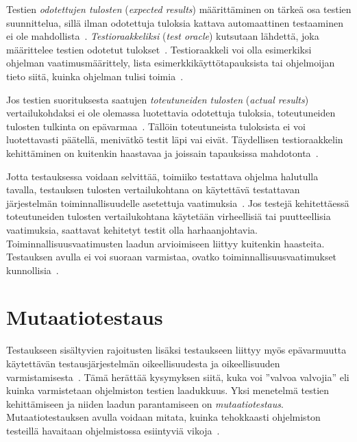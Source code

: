 \documentclass[finnish, grading]{tktltiki2}
\theoremstyle{definition}
\theoremstyle{remark}
\begin{document}
Testien \textit{odotettujen tulosten} (\textit{expected results}) määrittäminen on tärkeä osa testien suunnittelua, sillä ilman odotettuja tuloksia kattava automaattinen testaaminen ei ole mahdollista~\cite[s. 917]{Binder:1999}. \textit{Testioraakkeliksi} (\textit{test oracle}) kutsutaan lähdettä, joka määrittelee testien odotetut tulokset~\cite[s. 917]{Binder:1999}. Testioraakkeli voi olla esimerkiksi ohjelman vaatimusmäärittely, lista esimerkkikäyttötapauksista tai ohjelmoijan tieto siitä, kuinka ohjelman tulisi toimia~\cite[s. 918]{Binder:1999}. 

Jos testien suorituksesta saatujen \textit{toteutuneiden tulosten} (\textit{actual results}) vertailukohdaksi ei ole olemassa luotettavia odotettuja tuloksia, toteutuneiden tulosten tulkinta on epävarmaa~\cite[s. 58]{Binder:1999}. Tällöin toteutuneista tuloksista ei voi luotettavasti päätellä, menivätkö testit läpi vai eivät. Täydellisen testioraakkelin kehittäminen on kuitenkin haastavaa ja joissain tapauksissa mahdotonta~\cite[s. 58]{Binder:1999}.

Jotta testauksessa voidaan selvittää, toimiiko testattava ohjelma halutulla tavalla, testauksen tulosten vertailukohtana on käytettävä testattavan järjestelmän toiminnallisuudelle asetettuja vaatimuksia~\cite[s. 58]{Binder:1999}. Jos testejä kehitettäessä toteutuneiden tulosten vertailukohtana käytetään virheellisiä tai puutteellisia vaatimuksia, saattavat kehitetyt testit olla harhaanjohtavia. Toiminnallisuusvaatimusten laadun arvioimiseen liittyy kuitenkin haasteita. Testauksen avulla ei voi suoraan varmistaa, ovatko toiminnallisuusvaatimukset kunnollisia~\cite[s. 58]{Binder:1999}.


\section{Mutaatiotestaus}

Testaukseen sisältyvien rajoitusten lisäksi testaukseen liittyy myös epävarmuutta käytettävän testausjärjestelmän oikeellisuudesta ja oikeellisuuden varmistamisesta~\cite[s. 209]{Manna:Waldinger:1978}. Tämä herättää kysymyksen siitä, kuka voi ''valvoa valvojia'' eli kuinka varmistetaan ohjelmiston testien laadukkuus. Yksi menetelmä testien kehittämiseen ja niiden laadun parantamiseen on \textit{mutaatiotestaus}. Mutaatiotestauksen avulla voidaan mitata, kuinka tehokkaasti ohjelmiston testeillä havaitaan ohjelmistossa esiintyviä vikoja~\cite[s. 649]{Jia:Harman:2011}.
\end{document}
